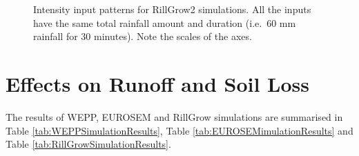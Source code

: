 \begin{figure}[htbp]
  \centering
  \caption[Intensity input patterns for RillGrow2 simulations.]{Intensity
input patterns for RillGrow2 simulations. All the inputs have the same total
rainfall amount and duration (i.e.\ 60 mm rainfall for 30 minutes). Note the
scales of the axes.}
  \label{fig:rillgrow2intensityinputs}
\end{figure}

\section{Effects on Runoff and Soil Loss}
\label{sec:ImplicationsOfRainfallIntensityChangesOnRunoffandSoilLoss}

The results of WEPP, EUROSEM and RillGrow simulations are summarised in Table
\ref{tab:WEPPSimulationResults}, Table \ref{tab:EUROSEMimulationResults} and
Table \ref{tab:RillGrowSimulationResults}.

